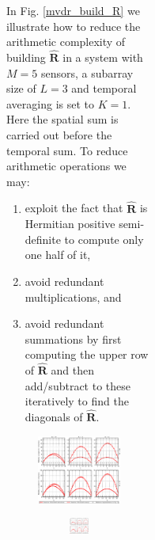 \documentclass[12pt,journal,draftclsnofoot,onecolumn]{IEEEtran}
\newcommand\mat[1]{\boldsymbol{#1}}
\newcommand\1{\vec 1}
\newcommand*\eR{\mat{\hat R}}
\begin{document}
\begin{figure}[H]
\begin{figure}[!t]
\begin{figure}[!t]
\begin{figure}[t]
In Fig. \ref{mvdr_build_R} we illustrate how to reduce the arithmetic complexity of building $\eR$ in a system with $M=5$ sensors, a subarray size of $L=3$ and temporal averaging is set to $K=1$. Here the spatial sum is carried out before the temporal sum. To reduce arithmetic operations we may:
%
\begin{enumerate}
\item exploit the fact that $\eR$ is Hermitian positive semi-definite to compute only one half of it,
\item avoid redundant multiplications, and
\item avoid redundant summations by first computing the upper row of $\eR$ and then add/subtract to these iteratively to find the diagonals of $\eR$.
\end{enumerate}
%
\ifPeerReview
\begin{figure}[!t]\centering
\includegraphics[width=.8\linewidth]{gfx/buske5.eps}
\else
\begin{figure}[!t]\centering
\includegraphics[width=\linewidth]{gfx/buildR-breakdown.eps}

\end{figure}
\end{figure}
\end{figure}
\end{figure}
\end{figure}
\end{figure}
\end{document}
